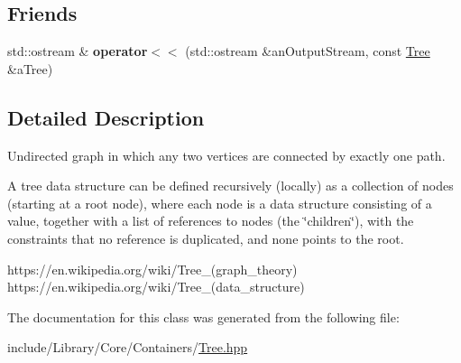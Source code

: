 \subsection*{Friends}
\begin{DoxyCompactItemize}
\item 
\mbox{\label{classlibrary_1_1core_1_1ctnr_1_1_tree_aca74cf66509d8f31b83b1c100cb00bea}} 
std\+::ostream \& {\bfseries operator$<$$<$} (std\+::ostream \&an\+Output\+Stream, const \hyperlink{classlibrary_1_1core_1_1ctnr_1_1_tree}{Tree} \&a\+Tree)
\end{DoxyCompactItemize}


\subsection{Detailed Description}
Undirected graph in which any two vertices are connected by exactly one path. 

A tree data structure can be defined recursively (locally) as a collection of nodes (starting at a root node), where each node is a data structure consisting of a value, together with a list of references to nodes (the \char`\"{}children\char`\"{}), with the constraints that no reference is duplicated, and none points to the root.

https\+://en.wikipedia.\+org/wiki/\+Tree\+\_\+(graph\+\_\+theory) https\+://en.wikipedia.\+org/wiki/\+Tree\+\_\+(data\+\_\+structure) 

The documentation for this class was generated from the following file\+:\begin{DoxyCompactItemize}
\item 
include/\+Library/\+Core/\+Containers/\hyperlink{_tree_8hpp}{Tree.\+hpp}\end{DoxyCompactItemize}

